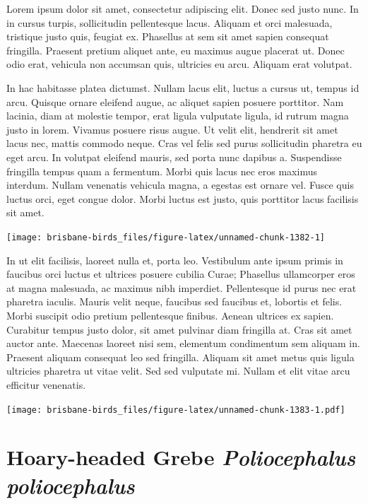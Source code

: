 \documentclass[]{book}
\let\origfigure\figure
\let\endorigfigure\endfigure
\renewenvironment{figure}[1][2] {
  \expandafter\origfigure\expandafter[H]
} {
  \endorigfigure
}
\begin{document}
Lorem ipsum dolor sit amet, consectetur adipiscing elit. Donec sed justo
nunc. In in cursus turpis, sollicitudin pellentesque lacus. Aliquam et
orci malesuada, tristique justo quis, feugiat ex. Phasellus at sem sit
amet sapien consequat fringilla. Praesent pretium aliquet ante, eu
maximus augue placerat ut. Donec odio erat, vehicula non accumsan quis,
ultricies eu arcu. Aliquam erat volutpat.

In hac habitasse platea dictumst. Nullam lacus elit, luctus a cursus ut,
tempus id arcu. Quisque ornare eleifend augue, ac aliquet sapien posuere
porttitor. Nam lacinia, diam at molestie tempor, erat ligula vulputate
ligula, id rutrum magna justo in lorem. Vivamus posuere risus augue. Ut
velit elit, hendrerit sit amet lacus nec, mattis commodo neque. Cras vel
felis sed purus sollicitudin pharetra eu eget arcu. In volutpat eleifend
mauris, sed porta nunc dapibus a. Suspendisse fringilla tempus quam a
fermentum. Morbi quis lacus nec eros maximus interdum. Nullam venenatis
vehicula magna, a egestas est ornare vel. Fusce quis luctus orci, eget
congue dolor. Morbi luctus est justo, quis porttitor lacus facilisis sit
amet.

\begin{figure}
\texttt{[image: brisbane-birds\_files/figure-latex/unnamed-chunk-1382-1]} \caption{insert figure caption}\label{fig:unnamed-chunk-1382}
\end{figure}

In ut elit facilisis, laoreet nulla et, porta leo. Vestibulum ante ipsum
primis in faucibus orci luctus et ultrices posuere cubilia Curae;
Phasellus ullamcorper eros at magna malesuada, ac maximus nibh
imperdiet. Pellentesque id purus nec erat pharetra iaculis. Mauris velit
neque, faucibus sed faucibus et, lobortis et felis. Morbi suscipit odio
pretium pellentesque finibus. Aenean ultrices ex sapien. Curabitur
tempus justo dolor, sit amet pulvinar diam fringilla at. Cras sit amet
auctor ante. Maecenas laoreet nisi sem, elementum condimentum sem
aliquam in. Praesent aliquam consequat leo sed fringilla. Aliquam sit
amet metus quis ligula ultricies pharetra ut vitae velit. Sed sed
vulputate mi. Nullam et elit vitae arcu efficitur venenatis.

\begin{figure}
\centering
\texttt{[image: brisbane-birds\_files/figure-latex/unnamed-chunk-1383-1.pdf]}
\caption{\label{fig:unnamed-chunk-1383}insert figure caption}
\end{figure}

\section{\texorpdfstring{Hoary-headed Grebe \emph{Poliocephalus
poliocephalus}}{Hoary-headed Grebe Poliocephalus poliocephalus}}\label{hoary-headed-grebe-poliocephalus-poliocephalus}
\end{document}
